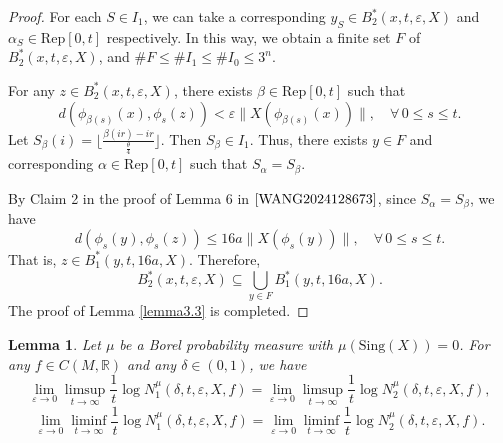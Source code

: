\documentclass[10pt]{article}
\newtheorem*{Theorem A}{Theorem A}
\newtheorem{Lemma}[Theorem]{Lemma}
\begin{document}
\begin{proof}
For each \( S \in I_1 \), we can take a corresponding \( y_S \in B_2^*(x, t, \varepsilon, X) \) and \( \alpha_S \in \text{Rep}[0, t] \) respectively. In this way, we obtain a finite set \( F \) of \( B_2^*(x, t, \varepsilon, X) \), and \( \#F \leq \#I_1 \leq \#I_0 \leq 3^n \).

For any \( z \in B_2^*(x, t, \varepsilon, X) \), there exists \( \beta \in \text{Rep}[0, t] \) such that
\[
d(\phi_{\beta(s)}(x), \phi_s(z)) < \varepsilon \|X(\phi_{\beta(s)}(x))\|, \quad \forall\,0\leq s \leq t.
\]
Let \( S_{\beta}(i) = \lfloor\frac{\beta(ir) - ir}{\frac{\theta}{4}}\rfloor \). Then \( S_{\beta} \in I_1 \). Thus, there exists \( y \in F \) and corresponding \( \alpha \in \text{Rep}[0, t] \) such that \( S_{\alpha} = S_{\beta} \).

By Claim 2 in the proof of Lemma 6 in \(\cite{WANG2024128673}\), since \( S_{\alpha} = S_{\beta} \), we have
\[
d(\phi_s(y), \phi_s(z)) \leq 16a \|X(\phi_s(y))\|, \quad \forall \,0\leq s \leq t.
\]
That is, \( z \in B_1^*(y, t, 16a, X) \). Therefore,
\[
B_2^*(x, t, \varepsilon, X) \subseteq \bigcup_{y \in F} B_1^*(y, t, 16a, X).
\]
The proof of Lemma \ref{lemma3.3} is completed.
\end{proof}

\begin{Lemma}\label{lemma3.4}
Let \( \mu \) be a Borel probability measure with \( \mu(\text{Sing}(X)) = 0 \). For any \( f \in C(M, \mathbb{R}) \) and any $\delta \in (0, 1)$, we have
\[
\lim_{\varepsilon \to 0} \limsup_{t \to \infty} \frac{1}{t} \log N_1^\mu(\delta, t, \varepsilon, X, f) = \lim_{\varepsilon \to 0} \limsup_{t \to \infty} \frac{1}{t} \log N_2^\mu(\delta, t, \varepsilon, X, f),
\]
\[
\lim_{\varepsilon \to 0} \liminf_{t \to \infty} \frac{1}{t} \log N_1^\mu(\delta, t, \varepsilon, X, f) = \lim_{\varepsilon \to 0} \liminf_{t \to \infty} \frac{1}{t} \log N_2^\mu(\delta, t, \varepsilon, X, f).
\]
\end{Lemma}
\end{document}
